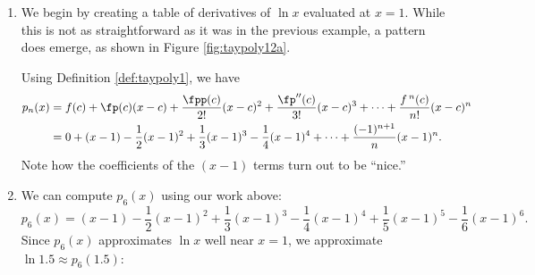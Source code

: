 {\begin{enumerate}
\item		We begin by creating a table of derivatives of $\ln x$ evaluated at $x=1$. While this is not as straightforward as it was in the previous example, a pattern does emerge, as shown in Figure \ref{fig:taypoly12a}.

Using Definition \ref{def:taypoly1}, we have \small
\begin{align*}
	p_n(x) &=	f(c) + \fp(c)(x-c) + \frac{\fpp(c)}{2!}(x-c)^2+\frac{\fp''(c)}{3!}(x-c)^3+\cdots+\frac{f\,^n(c)}{n!}(x-c)^n\\
					&= 0+(x-1)-\frac12(x-1)^2+\frac13(x-1)^3-\frac14(x-1)^4+\cdots+\frac{(-1)^{n+1}}{n}(x-1)^n.
\end{align*}
\normalsize
Note how the coefficients of the $(x-1)$ terms turn out to be ``nice.''

\item		We can compute $p_6(x)$ using our work above:
$$p_6(x) = (x-1)-\frac12(x-1)^2+\frac13(x-1)^3-\frac14(x-1)^4+\frac15(x-1)^5-\frac16(x-1)^6.$$
Since $p_6(x)$ approximates $\ln x$ well near $x=1$, we approximate $\ln 1.5 \approx p_6(1.5)$:


\end{enumerate}}
